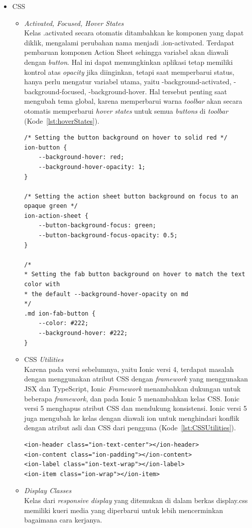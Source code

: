\begin{enumerate}
	\begin{itemize}
		\item CSS
		\begin{itemize}
			\item {\it Activated, Focused, Hover States} \\
			Kelas .activated secara otomatis ditambahkan ke komponen yang dapat diklik, mengalami perubahan nama menjadi .ion-activated. Terdapat pembaruan komponen Action Sheet sehingga variabel akan diawali dengan {\it button}. Hal ini dapat memungkinkan aplikasi tetap memiliki kontrol atas {\it opacity} jika diinginkan, tetapi saat memperbarui status, hanya perlu mengatur variabel utama, yaitu -background-activated, -background-focused, -background-hover. Hal tersebut penting saat mengubah tema global, karena memperbarui warna {\it toolbar} akan secara otomatis memperbarui {\it hover states} untuk semua {\it buttons} di {\it toolbar} (Kode~\ref{lst:hoverStates}). 		
			
\begin{lstlisting}[label={lst:hoverStates}, caption=Contoh Kode {\it Hover States} pada Ionic 5]
/* Setting the button background on hover to solid red */
ion-button {
	--background-hover: red;
	--background-hover-opacity: 1;
}

/* Setting the action sheet button background on focus to an opaque green */
ion-action-sheet {
	--button-background-focus: green;
	--button-background-focus-opacity: 0.5;
}

/*
* Setting the fab button background on hover to match the text color with
* the default --background-hover-opacity on md
*/
.md ion-fab-button {
	--color: #222;
	--background-hover: #222;
}
\end{lstlisting} 

			\item CSS {\it Utilities} \\
			Karena pada versi sebelumnya, yaitu Ionic versi 4, terdapat masalah dengan menggunakan atribut CSS dengan {\it framework} yang menggunakan JSX dan TypeScript, Ionic {\it Framework} menambahkan dukungan untuk beberapa {\it framework}, dan pada Ionic 5 menambahkan kelas CSS. Ionic versi 5 menghapus atribut CSS dan mendukung konsistensi. Ionic versi 5 juga mengubah ke kelas dengan diawali ion untuk menghindari konflik dengan atribut asli dan CSS dari pengguna (Kode~\ref{lst:CSSUtilities}).		
			
\begin{lstlisting}[label={lst:CSSUtilities}, caption=Contoh Kode Kelas CSS {\it Utility} pada Ionic 5]
<ion-header class="ion-text-center"></ion-header>
<ion-content class="ion-padding"></ion-content>
<ion-label class="ion-text-wrap"></ion-label>
<ion-item class="ion-wrap"></ion-item>
\end{lstlisting} 
  \newpage
			\item {\it Display Classes} \\ 
			Kelas dari {\it responsive display} yang ditemukan di dalam berkas display.css memiliki kueri media yang diperbarui untuk lebih mencerminkan bagaimana cara kerjanya.


\end{itemize}
\end{itemize}
\end{enumerate}
